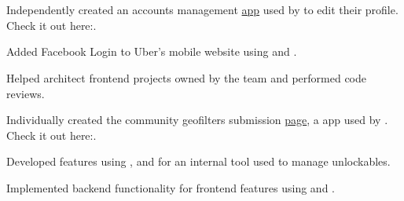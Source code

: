 \documentclass[letterpaper]{deedy-resume} %
\begin{document}
\begin{minipage}[t]{\textwidth}


\hspace{25pt}\\
\hspace{28pt}\\
\sectionspace



\vspace{4.2mm}
\begin{tightitemize}
\item Independently created an accounts management  \href{http://accounts.uber.com/profile}{app} used by  to edit their profile. \\
\vspace{2pt}
Check it out here:\href{http://accounts.uber.com/profile}{}.
\item Added Facebook Login to Uber's mobile website using  and .
\item Helped architect frontend projects owned by the team and performed code reviews.
\end{tightitemize}

\sectionspace
\addmarginbetween


\vspace{4.2mm}
\begin{tightitemize}
\item Individually created the community geofilters submission \href{https://www.snapchat.com/geofilters/submit.html}{page}, a  app used by . \\
\vspace{2pt}
Check it out here:\href{https://www.snapchat.com/geofilters/submit.html}{}.
\item Developed features using ,  and  for an internal tool used to manage unlockables.
\item Implemented backend functionality for frontend features using  and .
\end{tightitemize}


\end{minipage}
\end{document}
